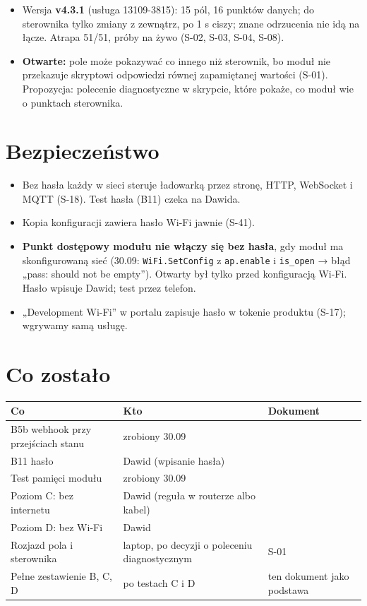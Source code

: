 \documentclass[11pt,a4paper]{article}
\begin{document}
\begin{itemize}
\item Wersja \textbf{v4.3.1} (usługa 13109-3815): 15 pól, 16 punktów danych; do sterownika tylko zmiany z zewnątrz, po 1 s ciszy; znane odrzucenia nie idą na łącze. Atrapa 51/51, próby na żywo  (S-02, S-03, S-04, S-08).
\item \textbf{Otwarte:} pole może pokazywać co innego niż sterownik, bo moduł nie przekazuje skryptowi odpowiedzi równej zapamiętanej wartości (S-01). Propozycja: polecenie diagnostyczne w skrypcie, które pokaże, co moduł wie o punktach sterownika.
\end{itemize}

\section*{Bezpieczeństwo}

\begin{itemize}
\item Bez hasła każdy w sieci steruje ładowarką przez stronę, HTTP, WebSocket i MQTT (S-18). Test hasła (B11) czeka na Dawida.
\item Kopia konfiguracji zawiera hasło Wi-Fi jawnie (S-41).
\item \textbf{Punkt dostępowy modułu nie włączy się bez hasła}, gdy moduł ma skonfigurowaną sieć (30.09: \texttt{WiFi.\allowbreak{}SetConfig} z \texttt{ap.enable} i \texttt{is\_open} {\symbolfont→} błąd „pass: should not be empty”). Otwarty był tylko przed konfiguracją Wi-Fi. Hasło wpisuje Dawid; test przez telefon.
\item „Development Wi-Fi” w portalu zapisuje hasło w tokenie produktu (S-17); wgrywamy samą usługę.
\end{itemize}

\section*{Co zostało}

\begin{longtable}{>{\raggedright\arraybackslash}p{6.57cm}>{\raggedright\arraybackslash}p{6.69cm}>{\raggedright\arraybackslash}p{2.02cm}}
\toprule
\rowcolor{apteallight}\textbf{Co} & \textbf{Kto} & \textbf{Dokument} \\
\midrule\endhead
\bottomrule\endfoot
B5b webhook przy przejściach stanu & \leavevmode{\symbolfont\color{apgreen}\textbf{✔}} zrobiony 30.09 & 01 \\
B11 hasło & Dawid (wpisanie hasła) & 01 \\
Test pamięci modułu & \leavevmode{\symbolfont\color{apgreen}\textbf{✔}} zrobiony 30.09 & 04 \\
Poziom C: bez internetu & Dawid (reguła w routerze albo kabel) & 02 \\
Poziom D: bez Wi-Fi & Dawid & 03 \\
Rozjazd pola i sterownika & laptop, po decyzji o poleceniu diagnostycznym & S-01 \\
Pełne zestawienie B, C, D & po testach C i D & ten dokument jako podstawa \\
\end{longtable}
\end{document}
